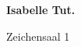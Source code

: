 \documentclass[a4paper]{article}
\begin{document}
\printGenericVSLHeader
\begin{center}
\begin{vsltext}{3cm}{4cm}

   \vspace{0.5cm} 

    \textbf{Isabelle Tut.} 

    \vspace{1.5cm}

    Zeichensaal 1

\end{vsltext}

\end{center}
\end{document}
